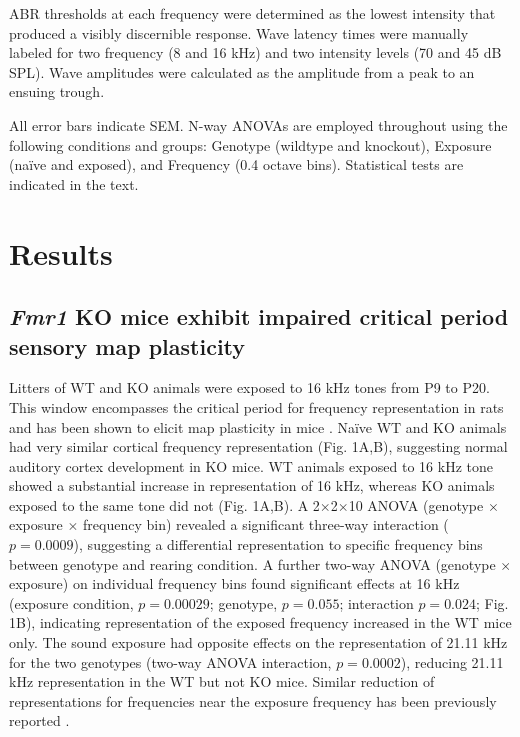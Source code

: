 ABR thresholds at each frequency were determined as the lowest intensity that produced a visibly discernible response. Wave latency times were manually labeled for two frequency (8 and 16 kHz) and two intensity levels (70 and 45 dB SPL). Wave amplitudes were calculated as the amplitude from a peak to an ensuing trough.

All error bars indicate SEM. N-way ANOVAs are employed throughout using the following conditions and groups: Genotype (wildtype and knockout), Exposure (na\"ive and exposed), and Frequency (0.4 octave bins). Statistical tests are indicated in the text.

\section{Results}

\subsection{\textit{Fmr1} KO mice exhibit impaired critical period sensory map plasticity}

Litters of WT and KO animals were exposed to 16 kHz tones from P9 to P20. This window encompasses the critical period for frequency representation in rats \cite{DeVillers-Sidani2007, Insanally2009} and has been shown to elicit map plasticity in mice \cite{Barkat2011}. Na\"ive WT and KO animals had very similar cortical frequency representation (Fig. 1A,B), suggesting normal auditory cortex development in KO mice. WT animals exposed to 16 kHz tone showed a substantial increase in representation of 16 kHz, whereas KO animals exposed to the same tone did not (Fig. 1A,B). A 2$\times$2$\times$10 ANOVA (genotype $\times$ exposure $\times$ frequency bin) revealed a significant three-way interaction ($p=0.0009$), suggesting a differential representation to specific frequency bins between genotype and rearing condition. A further two-way ANOVA (genotype $\times$ exposure) on individual frequency bins found significant effects at 16 kHz (exposure condition, $p=0.00029$; genotype, $p=0.055$; interaction $p=0.024$; Fig. 1B), indicating representation of the exposed frequency increased in the WT mice only. The sound exposure had opposite effects on the representation of 21.11 kHz for the two genotypes (two-way ANOVA interaction, $p=0.0002$), reducing 21.11 kHz representation in the WT but not KO mice. Similar reduction of representations for frequencies near the exposure frequency has been previously reported \cite{Han2007}.

